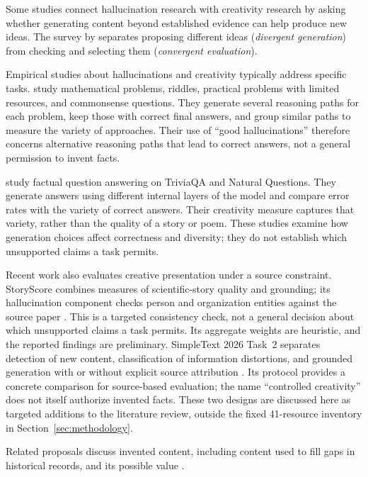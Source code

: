 \documentclass{clv2025}
\begin{document}
Some studies connect hallucination research with creativity research by
asking whether generating content beyond established evidence can help
produce new ideas. The survey by \citet{jiang_survey_2024} separates
proposing different ideas (\emph{divergent generation}) from checking and
selecting them (\emph{convergent evaluation}).

Empirical studies about hallucinations and creativity typically address specific tasks. \citet{sun_hallucinating_2024}
study mathematical problems, riddles, practical problems with limited
resources, and commonsense questions. They generate several reasoning paths
for each problem, keep those with correct final answers, and group similar
paths to measure the variety of approaches. Their use of ``good
hallucinations'' therefore concerns alternative reasoning paths that lead
to correct answers, not a general permission to invent facts.

\citet{he_shakespearean_2025} study factual question answering on TriviaQA
and Natural Questions. They generate answers using different internal
layers of the model and compare error rates with the variety of correct
answers. Their creativity measure captures that variety, rather than the
quality of a story or poem. These studies examine how generation choices
affect correctness and diversity; they do not establish which unsupported
claims a task permits.

Recent work also evaluates creative presentation under a source constraint.
StoryScore combines measures of scientific-story quality and grounding; its
hallucination component checks person and organization entities against the
source paper \citep{argese_storyscore_2026}. This is a targeted consistency
check, not a general decision about which unsupported claims a task permits.
Its aggregate weights are heuristic, and the reported findings are preliminary.
SimpleText 2026 Task~2 separates detection of new content, classification of
information distortions, and grounded generation with or without explicit
source attribution \citep{simpletext_task2_2026}. Its protocol provides a
concrete comparison for source-based evaluation; the name ``controlled
creativity'' does not itself authorize invented facts. These two designs
are discussed here as targeted additions to the literature review, outside
the fixed 41-resource inventory in Section~\ref{sec:methodology}.

Related proposals discuss invented content, including content used to fill
gaps in historical records, and its possible value
\citep{sui_confabulation_2024,sui_critical_2025,yang_hicbench_2025}.
\end{document}
